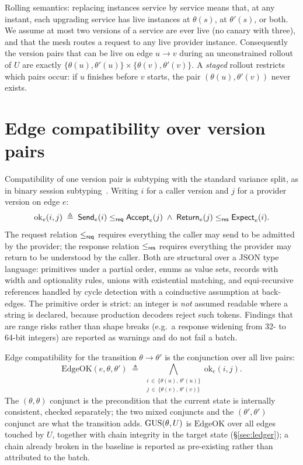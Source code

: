 Rolling semantics: replacing instances service by service means that,
at any instant, each upgrading service has live instances at
$\theta(s)$, at $\theta'(s)$, or both. We assume at most two versions
of a service are ever live (no canary with three), and that the mesh
routes a request to any live provider instance. Consequently the
version pairs that can be live on edge $u \to v$ during an
unconstrained rollout of $U$ are exactly
$\{\theta(u), \theta'(u)\} \times \{\theta(v), \theta'(v)\}$.
A \emph{staged} rollout restricts which pairs occur: if $u$ finishes
before $v$ starts, the pair $(\theta(u), \theta'(v))$ never exists.

\section{Edge compatibility over version pairs}
\label{sec:edge}

Compatibility of one version pair is subtyping with the standard
variance split, as in binary session
subtyping~\cite{gay2005subtyping}. Writing $i$ for a caller version
and $j$ for a provider version on edge $e$:
\[
\mathrm{ok}_e(i,j) \;\triangleq\;
\mathsf{Send}_e(i) \leq_{\mathsf{req}} \mathsf{Accept}_e(j)
\;\wedge\;
\mathsf{Return}_e(j) \leq_{\mathsf{res}} \mathsf{Expect}_e(i).
\]
The request relation $\leq_{\mathsf{req}}$ requires everything the caller may send
to be admitted by the provider; the response relation $\leq_{\mathsf{res}}$
requires everything the provider may return to be understood by the
caller. Both are structural over a JSON type language: primitives
under a partial order, enums as value sets, records with
width and optionality rules, unions with existential matching, and
equi-recursive references handled by cycle detection with a
coinductive assumption at back-edges. The primitive order is strict:
an integer is \emph{not} assumed readable where a string is declared,
because production decoders reject such tokens. Findings that are
range risks rather than shape breaks (e.g.\ a response widening from
32- to 64-bit integers) are reported as warnings and do not fail a
batch.

Edge compatibility for the transition $\theta \to \theta'$ is the
conjunction over all live pairs:
\[
\mathrm{EdgeOK}(e, \theta, \theta') \;\triangleq\;
\bigwedge_{\substack{i \,\in\, \{\theta(u),\,\theta'(u)\}\\
                     j \,\in\, \{\theta(v),\,\theta'(v)\}}}
\mathrm{ok}_e(i,j).
\]
The $(\theta,\theta)$ conjunct is the precondition that the current
state is internally consistent, checked separately; the two mixed
conjuncts and the $(\theta',\theta')$ conjunct are what the transition
adds. $\mathrm{GUS}(\theta, U)$ is $\mathrm{EdgeOK}$ over all edges touched by
$U$, together with chain integrity in the target state
(\S\ref{sec:ledger}); a chain already broken in the baseline is
reported as pre-existing rather than attributed to the batch.

